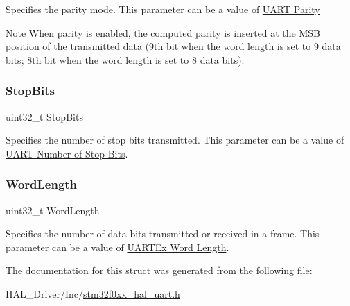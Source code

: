 Specifies the parity mode. This parameter can be a value of \hyperlink{group___u_a_r_t___parity}{U\+A\+RT Parity} \begin{DoxyNote}{Note}
When parity is enabled, the computed parity is inserted at the M\+SB position of the transmitted data (9th bit when the word length is set to 9 data bits; 8th bit when the word length is set to 8 data bits). 
\end{DoxyNote}
\mbox{\label{struct_u_a_r_t___init_type_def_a8394ba239444e3e5fe1ada1c37cb1019}} 
\subsubsection{\texorpdfstring{Stop\+Bits}{StopBits}}
{\footnotesize\ttfamily uint32\+\_\+t Stop\+Bits}

Specifies the number of stop bits transmitted. This parameter can be a value of \hyperlink{group___u_a_r_t___stop___bits}{U\+A\+RT Number of Stop Bits}. \mbox{\label{struct_u_a_r_t___init_type_def_ae5e60b9a021fe0009588fc86c7584a5a}} 
\subsubsection{\texorpdfstring{Word\+Length}{WordLength}}
{\footnotesize\ttfamily uint32\+\_\+t Word\+Length}

Specifies the number of data bits transmitted or received in a frame. This parameter can be a value of \hyperlink{group___u_a_r_t_ex___word___length}{U\+A\+R\+T\+Ex Word Length}. 

The documentation for this struct was generated from the following file\+:\begin{DoxyCompactItemize}
\item 
H\+A\+L\+\_\+\+Driver/\+Inc/\hyperlink{stm32f0xx__hal__uart_8h}{stm32f0xx\+\_\+hal\+\_\+uart.\+h}\end{DoxyCompactItemize}
